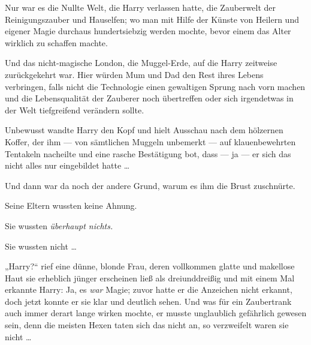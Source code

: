Nur war es die Nullte Welt, die Harry verlassen hatte, die Zauberwelt der Reinigungszauber und Hauselfen; wo man mit Hilfe der Künste von Heilern und eigener Magie durchaus hundertsiebzig werden mochte, bevor einem das Alter wirklich zu schaffen machte.

Und das nicht-magische London, die Muggel-Erde, auf die Harry zeitweise zurückgekehrt war. Hier würden Mum und Dad den Rest ihres Lebens verbringen, falls nicht die Technologie einen gewaltigen Sprung nach vorn machen und die Lebensqualität der Zauberer noch übertreffen oder sich irgendetwas in der Welt tiefgreifend verändern sollte.

Unbewusst wandte Harry den Kopf und hielt Ausschau nach dem hölzernen Koffer, der ihm — von sämtlichen Muggeln unbemerkt — auf klauenbewehrten Tentakeln nacheilte und eine rasche Bestätigung bot, dass — ja — er sich das nicht alles nur eingebildet hatte …

Und dann war da noch der andere Grund, warum es ihm die Brust zuschnürte.

Seine Eltern wussten keine Ahnung.

Sie wussten \emph{überhaupt nichts.}

Sie wussten nicht …

„Harry?“ rief eine dünne, blonde Frau, deren vollkommen glatte und makellose Haut sie erheblich jünger erscheinen ließ als dreiunddreißig und mit einem Mal erkannte Harry: Ja, es \emph{war} Magie; zuvor hatte er die Anzeichen nicht erkannt, doch jetzt konnte er sie klar und deutlich sehen. Und was für ein Zaubertrank auch immer derart lange wirken mochte, er musste unglaublich gefährlich gewesen sein, denn die meisten Hexen taten sich das nicht an, so verzweifelt waren sie nicht …

